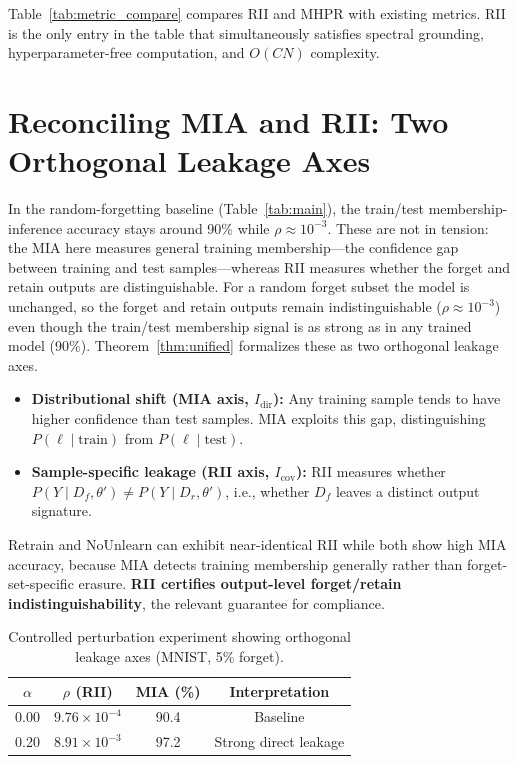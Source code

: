 \documentclass[smallextended]{svjour3}       %
\begin{document}
Table~\ref{tab:metric_compare} compares RII and MHPR with existing metrics. RII is the only entry in the table that simultaneously satisfies spectral grounding, hyperparameter-free computation, and $O(CN)$ complexity.

\section{Reconciling MIA and RII: Two Orthogonal Leakage Axes}
\label{sec:mia}

In the random-forgetting baseline (Table~\ref{tab:main}), the train/test membership-inference accuracy stays around 90\% while $\rho \approx 10^{-3}$. These are not in tension: the MIA here measures general training membership---the confidence gap between training and test samples---whereas RII measures whether the forget and retain outputs are distinguishable. For a random forget subset the model is unchanged, so the forget and retain outputs remain indistinguishable ($\rho\approx10^{-3}$) even though the train/test membership signal is as strong as in any trained model (90\%). Theorem~\ref{thm:unified} formalizes these as two orthogonal leakage axes.

\begin{itemize}
\item \textbf{Distributional shift (MIA axis, $I_{\mathrm{dir}}$):} Any training sample tends to have higher confidence than test samples. MIA exploits this gap, distinguishing $P(\ell\mid\text{train})$ from $P(\ell\mid\text{test})$.
\item \textbf{Sample-specific leakage (RII axis, $I_{\mathrm{cov}}$):} RII measures whether $P(Y\mid D_f,\theta') \neq P(Y\mid D_r,\theta')$, i.e., whether $D_f$ leaves a distinct output signature.
\end{itemize}

Retrain and NoUnlearn can exhibit near-identical RII while both show high MIA accuracy, because MIA detects training membership generally rather than forget-set-specific erasure. \textbf{RII certifies output-level forget/retain indistinguishability}, the relevant guarantee for compliance.

\begin{table}[t]
\centering
\caption{Controlled perturbation experiment showing orthogonal leakage axes (MNIST, 5\% forget).}\label{tab:alpha}
\setlength{\tabcolsep}{3pt}
\begin{tabular}{c c c c}
\toprule
$\alpha$ & $\rho$ (RII) & MIA (\%) & Interpretation \\
\midrule
0.00 & $9.76{\times}10^{-4}$ & 90.4 & Baseline \\
0.20 & $8.91{\times}10^{-3}$ & 97.2 & Strong direct leakage \\
\bottomrule
\end{tabular}
\end{table}
\end{document}
